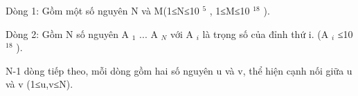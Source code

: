 Dòng 1: Gồm một số nguyên N và M(1≤N≤10   $^    5   $   , 1≤M≤10   $^    18   $   ).  

   Dòng 2: Gồm N số nguyên A   $_    1   $   ... A   $_    N   $   với A   $_    i   $   là trọng số của đỉnh thứ i. (A   $_    i   $   ≤10   $^    18   $   ).  

   N-1 dòng tiếp theo, mỗi dòng gồm hai số nguyên u và v, thể hiện cạnh nối giữa u và v (1≤u,v≤N).  

\